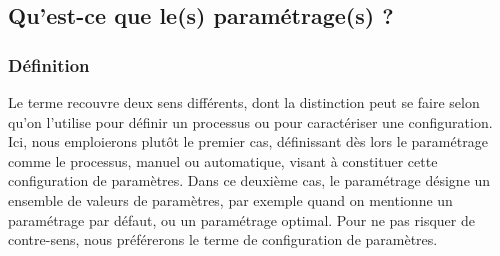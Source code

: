 \subsection{Qu'est-ce que le(s) paramétrage(s) ?}

\subsubsection{Définition}


Le terme recouvre deux sens différents, dont la distinction peut se faire selon qu'on l'utilise pour définir un processus ou pour caractériser une configuration.
Ici, nous emploierons plutôt le premier cas, définissant dès lors le paramétrage comme le processus, manuel ou automatique, visant à constituer cette configuration de paramètres.
Dans ce deuxième cas, le paramétrage désigne un ensemble de valeurs de paramètres, par exemple quand on mentionne un paramétrage par défaut, ou un paramétrage optimal.
Pour ne pas risquer de contre-sens, nous préférerons le terme de configuration de paramètres.

